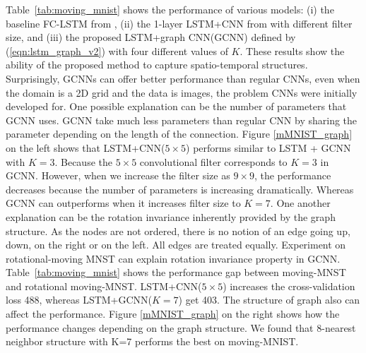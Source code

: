 \documentclass{article} %
\newcommand{\tabref}[1]{Table~\ref{tab:#1}}
\newcommand{\eqnref}[1]{(\ref{eqn:#1})}
\begin{document}

\tabref{moving_mnist} shows the performance of various models: (i) the baseline
FC-LSTM from \citet{convlstm}, (ii) the 1-layer LSTM+CNN from \citet{convlstm}
with different filter size, and (iii) the proposed LSTM+graph CNN(GCNN) defined by \eqnref{lstm_graph_v2} with four
different values of $K$. These results show the ability of the proposed method
to capture spatio-temporal structures. Surprisingly, GCNNs can offer
better performance than regular CNNs, even when the domain is a 2D grid and the
data is images, the problem CNNs were initially developed for. One possible explanation can be the number of parameters that GCNN uses. GCNN take much less parameters than regular CNN by sharing the parameter depending on the length of the connection. Figure \ref{mMNIST_graph} on the left shows that LSTM+CNN($5\times5$) performs similar to LSTM + GCNN with $K = 3$. Because the $5\times5$ convolutional filter corresponds to $K=3$ in GCNN. However, when we increase the filter size as $9\times9$, the performance decreases because the number of parameters is increasing dramatically. Whereas GCNN can outperforms when it increases filter size to $K=7$. One another explanation can be the rotation invariance inherently provided by the graph structure. As
the nodes are not ordered, there is no notion of an edge going up, down, on the
right or on the left. All edges are treated equally. Experiment on rotational-moving MNST can explain rotation invariance property in GCNN. \tabref{moving_mnist} shows the performance gap between moving-MNST and rotational moving-MNST. LSTM+CNN($5\times5$) increases the cross-validation loss 488, whereas LSTM+GCNN($K=7$) get 403. The structure of graph also can affect the performance. Figure \ref{mMNIST_graph} on the right shows how the performance changes depending on the graph structure. We found that 8-nearest neighbor structure with K=7 performs the best on moving-MNIST. 

\end{document}
